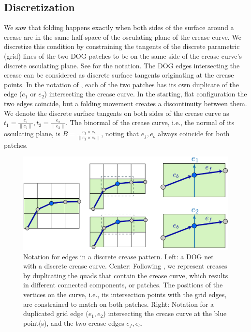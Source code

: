 \subsection{Discretization}
We saw that folding happens exactly when both sides of the surface around a crease are in the same half-space of the osculating plane of the crease curve. We discretize this condition by constraining the tangents of the discrete parametric (grid) lines of the two DOG patches to be on the same side of the crease curve's discrete osculating plane. See  for the notation. The DOG edges intersecting the crease can be considered as discrete surface tangents originating at the crease points. In the notation of , each of the two patches has its own duplicate of the edge ($e_1$ or $e_2$) intersecting the crease curve. In the starting, flat configuration the two edges coincide, but a folding movement creates a discontinuity between them. We denote the discrete surface tangents on both sides of the crease curve as $t_1 = \frac{e_1}{\|e_1\|}, t_2 = \frac{e_2}{\|e_2\|}$. The binormal of the crease curve, i.e., the normal of its osculating plane, is $B = \frac{e_f \times e_b}{\|e_f \times e_b\|}$, noting that $e_f,e_b$ always coincide for both patches.

\begin{figure} [h]
	\centering
	\includegraphics[width=\linewidth]{figures/osc_plane_discretization}
	\caption{Notation for edges in a discrete crease pattern. Left: a DOG net with a discrete crease curve. Center: Following \cite{rabi2018shape}, we represent creases by duplicating the quads that contain the crease curve, which results in different connected components, or patches. The positions of the vertices on the curve, i.e., its intersection points with the grid edges, are constrained to match on both patches. Right: Notation for a duplicated grid edge ($e_1, e_2$) intersecting the crease curve at the blue point(s), and the two crease edges $e_f,e_b$. }
	\label{fig:osc_plane_discretization}
\end{figure}

